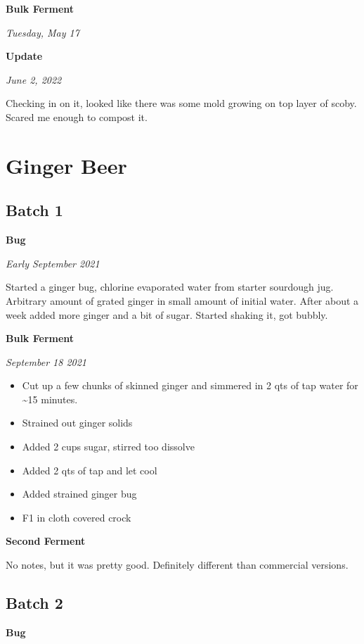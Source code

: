 \documentclass[
]{book}
\begin{document}
\textbf{Bulk Ferment}

\emph{Tuesday, May 17}

\textbf{Update}

\emph{June 2, 2022}

Checking in on it, looked like there was some mold growing on top layer of scoby. Scared me enough to compost it.

\hypertarget{ginger-beer}{%
\chapter{Ginger Beer}\label{ginger-beer}}

\hypertarget{batch-1}{%
\section{Batch 1}\label{batch-1}}

\textbf{Bug}

\emph{Early September 2021}

Started a ginger bug, chlorine evaporated water from starter sourdough jug. Arbitrary amount of grated ginger in small amount of initial water. After about a week added more ginger and a bit of sugar. Started shaking it, got bubbly.

\textbf{Bulk Ferment}

\emph{September 18 2021}

\begin{itemize}
\item
  Cut up a few chunks of skinned ginger and simmered in 2 qts of tap water for \textasciitilde15 minutes.
\item
  Strained out ginger solids
\item
  Added 2 cups sugar, stirred too dissolve
\item
  Added 2 qts of tap and let cool
\item
  Added strained ginger bug
\item
  F1 in cloth covered crock
\end{itemize}

\textbf{Second Ferment}

No notes, but it was pretty good. Definitely different than commercial versions.

\hypertarget{batch-2}{%
\section{Batch 2}\label{batch-2}}

\textbf{Bug}
\end{document}
